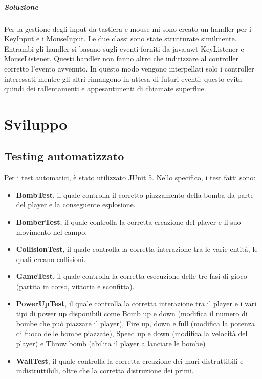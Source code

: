 \documentclass[a4paper,12pt]{report}
\begin{document}
\paragraph{Soluzione} Per la gestione degli input da tastiera e mouse mi sono creato un handler per i KeyInput e i MouseInput. Le due classi sono state strutturate similmente. Entrambi gli handler si basano sugli eventi forniti da java.awt KeyListener e MouseListener. Questi handler non fanno altro che indirizzare al controller corretto l’evento avvenuto. In questo modo vengono interpellati solo i controller interessati mentre gli altri rimangono in attesa di futuri eventi; questo evita quindi dei rallentamenti e appesantimenti di chiamate superflue.

\chapter{Sviluppo}
\section{Testing automatizzato}
Per i test automatici, è stato utilizzato JUnit 5.
Nello specifico, i test fatti sono:
\begin{itemize}
    \item \textbf{BombTest}, il quale controlla il corretto piazzamento della bomba da parte del player e la conseguente esplosione.
    \item \textbf{BomberTest}, il quale controlla la corretta creazione del player e il suo movimento nel campo.
    \item \textbf{CollisionTest}, il quale controlla la corretta interazione tra le varie entità, le quali creano collisioni.
    \item \textbf{GameTest}, il quale controlla la corretta esecuzione delle tre fasi di gioco (partita in corso, vittoria e sconfitta).
    \item \textbf{PowerUpTest}, il quale controlla la corretta interazione tra il player e i vari tipi di power up disponibili come Bomb up e down (modifica il numero di bombe che può piazzare il player), Fire up, down e full (modifica la potenza di fuoco delle bombe piazzate), Speed up e down (modifica la velocità del player) e Throw bomb (abilita il player a lanciare le bombe)
    \item \textbf{WallTest}, il quale controlla la corretta creazione dei muri distruttibili e indistruttibili, oltre che la corretta distruzione dei primi.
\end{itemize}
\end{document}
